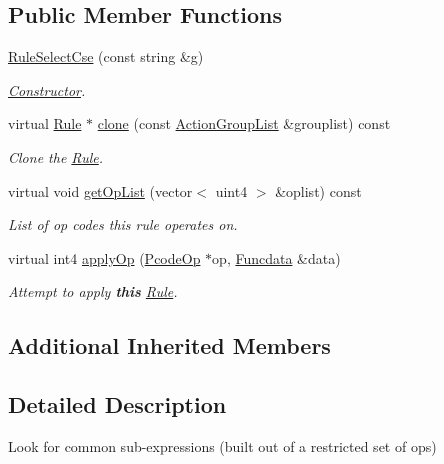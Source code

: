 \subsection*{Public Member Functions}
\begin{DoxyCompactItemize}
\item 
\mbox{\hyperlink{class_rule_select_cse_aaf3f9e25cfa07366d4e00e32f41cea5a}{Rule\+Select\+Cse}} (const string \&g)
\begin{DoxyCompactList}\small\item\em \mbox{\hyperlink{class_constructor}{Constructor}}. \end{DoxyCompactList}\item 
virtual \mbox{\hyperlink{class_rule}{Rule}} $\ast$ \mbox{\hyperlink{class_rule_select_cse_ab2c0796a0126999042fd074de0e379fb}{clone}} (const \mbox{\hyperlink{class_action_group_list}{Action\+Group\+List}} \&grouplist) const
\begin{DoxyCompactList}\small\item\em Clone the \mbox{\hyperlink{class_rule}{Rule}}. \end{DoxyCompactList}\item 
virtual void \mbox{\hyperlink{class_rule_select_cse_ac80eb4274ae96abff206fa852d61d0cc}{get\+Op\+List}} (vector$<$ uint4 $>$ \&oplist) const
\begin{DoxyCompactList}\small\item\em List of op codes this rule operates on. \end{DoxyCompactList}\item 
virtual int4 \mbox{\hyperlink{class_rule_select_cse_a2b1b3ea7c8acf61be61ab068385ec967}{apply\+Op}} (\mbox{\hyperlink{class_pcode_op}{Pcode\+Op}} $\ast$op, \mbox{\hyperlink{class_funcdata}{Funcdata}} \&data)
\begin{DoxyCompactList}\small\item\em Attempt to apply {\bfseries{this}} \mbox{\hyperlink{class_rule}{Rule}}. \end{DoxyCompactList}\end{DoxyCompactItemize}
\subsection*{Additional Inherited Members}


\subsection{Detailed Description}
Look for common sub-\/expressions (built out of a restricted set of ops) 

